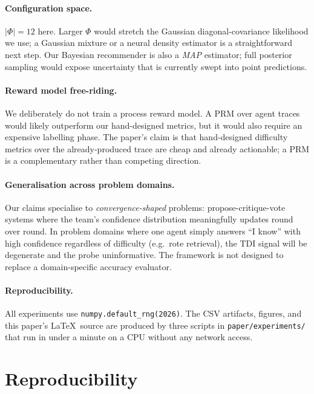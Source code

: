 \documentclass[10pt,a4paper]{article}
\begin{document}
\paragraph{Configuration space.} $|\Phi|\!=\!12$ here. Larger $\Phi$ would
stretch the Gaussian diagonal-covariance likelihood we use; a Gaussian mixture
or a neural density estimator is a straightforward next step. Our Bayesian
recommender is also a \emph{MAP} estimator; full posterior sampling would
expose uncertainty that is currently swept into point predictions.

\paragraph{Reward model free-riding.} We deliberately do not train a process
reward model. A PRM over agent traces would likely outperform our
hand-designed metrics, but it would also require an expensive labelling phase.
The paper's claim is that hand-designed difficulty metrics over the
already-produced trace are cheap and already actionable; a PRM is a
complementary rather than competing direction.

\paragraph{Generalisation across problem domains.} Our claims specialise to
\emph{convergence-shaped} problems: propose-critique-vote systems where the
team's confidence distribution meaningfully updates round over round. In
problem domains where one agent simply answers ``I know'' with high confidence
regardless of difficulty (e.g.\ rote retrieval), the TDI signal will be
degenerate and the probe uninformative. The framework is not designed to
replace a domain-specific accuracy evaluator.

\paragraph{Reproducibility.} All experiments use \texttt{numpy.default\_rng(2026)}.
The CSV artifacts, figures, and this paper's \LaTeX\ source are produced by
three scripts in \texttt{paper/experiments/} that run in under a minute on a
CPU without any network access.

\section{Reproducibility}\label{sec:reproducibility}
\end{document}
